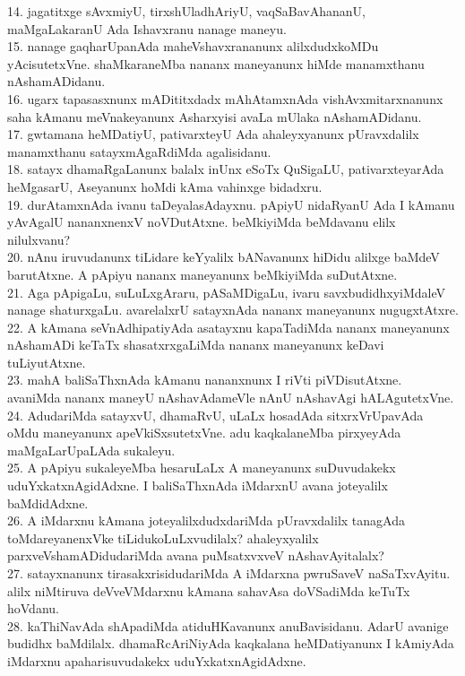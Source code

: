 \documentclass{article}
\begin{document}
14. jagatitxge sAvxmiyU, tirxshUladhAriyU, vaqSaBavAhananU, maMgaLakaranU Ada Ishavxranu nanage maneyu.\\
15. nanage gaqharUpanAda maheVshavxrananunx alilxdudxkoMDu yAcisutetxVne. shaMkaraneMba nananx maneyanunx hiMde manamxthanu nAshamADidanu.\\
16. ugarx tapasasxnunx mADititxdadx mAhAtamxnAda vishAvxmitarxnanunx saha kAmanu meVnakeyanunx Asharxyisi avaLa mUlaka nAshamADidanu.\\
17. gwtamana heMDatiyU, pativarxteyU Ada ahaleyxyanunx pUravxdalilx manamxthanu satayxmAgaRdiMda agalisidanu.\\
18. satayx dhamaRgaLanunx balalx inUnx eSoTx QuSigaLU, pativarxteyarAda heMgasarU, Aseyanunx hoMdi kAma vahinxge bidadxru.\\
19. durAtamxnAda ivanu taDeyalasAdayxnu. pApiyU nidaRyanU Ada I kAmanu yAvAgalU nananxnenxV noVDutAtxne. beMkiyiMda beMdavanu elilx nilulxvanu?\\
20. nAnu iruvudanunx tiLidare keYyalilx bANavanunx hiDidu alilxge baMdeV barutAtxne. A pApiyu nananx maneyanunx beMkiyiMda suDutAtxne.\\
21. Aga pApigaLu, suLuLxgAraru, pASaMDigaLu, ivaru savxbudidhxyiMdaleV nanage shaturxgaLu. avarelalxrU satayxnAda nananx maneyanunx nugugxtAtxre.\\
22. A kAmana seVnAdhipatiyAda asatayxnu kapaTadiMda nananx maneyanunx nAshamADi keTaTx shasatxrxgaLiMda nananx maneyanunx keDavi tuLiyutAtxne.\\
23. mahA baliSaThxnAda kAmanu nananxnunx I riVti piVDisutAtxne. avaniMda nananx maneyU nAshavAdameVle nAnU nAshavAgi hALAgutetxVne.\\
24. AdudariMda satayxvU, dhamaRvU, uLaLx hosadAda sitxrxVrUpavAda oMdu maneyanunx apeVkiSxsutetxVne. adu kaqkalaneMba pirxyeyAda maMgaLarUpaLAda sukaleyu.\\
25. A pApiyu sukaleyeMba hesaruLaLx A maneyanunx suDuvudakekx uduYxkatxnAgidAdxne. I baliSaThxnAda iMdarxnU avana joteyalilx baMdidAdxne.\\
26. A iMdarxnu kAmana joteyalilxdudxdariMda pUravxdalilx tanagAda toMdareyanenxVke tiLidukoLuLxvudilalx? ahaleyxyalilx parxveVshamADidudariMda avana puMsatxvxveV nAshavAyitalalx?\\
27. satayxnanunx tirasakxrisidudariMda A iMdarxna pwruSaveV naSaTxvAyitu. alilx niMtiruva deVveVMdarxnu kAmana sahavAsa doVSadiMda keTuTx hoVdanu.\\
28. kaThiNavAda shApadiMda atiduHKavanunx anuBavisidanu. AdarU avanige budidhx baMdilalx. dhamaRcAriNiyAda kaqkalana heMDatiyanunx I kAmiyAda iMdarxnu apaharisuvudakekx uduYxkatxnAgidAdxne.\\
\end{document}
